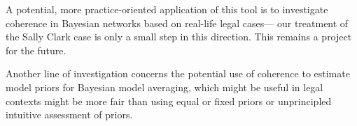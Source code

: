 \documentclass[10pt,]{scrartcl}
\begin{document}
A potential, more practice-oriented  application of this tool is to investigate coherence in  Bayesian networks based on real-life legal cases--- our treatment of the Sally Clark case is only a small step in this direction. This remains a project for the future.

Another line of investigation concerns
the potential use of coherence to    estimate model priors for Bayesian model averaging, which might be useful in legal contexts might be more fair  than using equal or fixed priors or unprincipled intuitive assessment of priors. 































\end{document}
